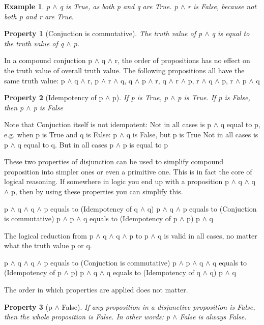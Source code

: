 \documentclass[10pt,a4paper,draft,titlepage,onecolumn]{book}
\newtheorem{example}{Example}[section]
\newtheorem{property}{Property}[section]
\begin{document}
\begin{example}
p $\wedge$ q is True, as both p and q are True.
p $\wedge$ r is False, because not both p and r are True.
\end{example}

\begin{property}[Conjuction is commutative] The truth value of p $\wedge$  q is equal to the truth value of q $\wedge$ p.
\end{property}
In a compound conjuction p $\wedge$ q $\wedge$ r, the order of propositions has no effect on the truth value of overall truth value. The following propositions all have the same truth value:
p $\wedge$ q $\wedge$ r,
p $\wedge$ r $\wedge$ q,
q $\wedge$ p $\wedge$ r,
q $\wedge$ r $\wedge$ p,
r $\wedge$ q $\wedge$ p,
r $\wedge$ p $\wedge$ q
\begin{property}[Idempotency of p $\wedge$  p] If p is True, p $\wedge$ p is True. If p is False, then p $\wedge$ p is False
\end{property}
Note that Conjuction itself is not idempotent: 
Not in all cases is  p $\wedge$ q equal to p, e.g. when p is True and q is False: p $\wedge$ q is False, but p is True
Not in all cases is  p $\wedge$ q equal to q. 
But in all cases   p $\wedge$ p is equal to p 

These two properties of disjunction can be used to simplify compound proposition into simpler ones or even a primitive one. This is in fact the core of logical reasoning. 
If somewhere in logic you end up with a proposition p $\wedge$ q $\wedge$ q $\wedge$ p, then by using these properties you can simplify this.

p $\wedge$ q $\wedge$ q $\wedge$ p
equals to (Idempotency of q $\wedge$ q) 
p $\wedge$ q $\wedge$ p
equals to  (Conjuction is commutative)
p $\wedge$ p $\wedge$ q
equals to (Idempotency of p $\wedge$ p)
p $\wedge$ q

The logical reduction from  p $\wedge$ q $\wedge$ q $\wedge$ p to p $\wedge$ q is valid in all cases, no matter what the truth value p or q.				

p $\wedge$ q $\wedge$ q $\wedge$ p
equals to (Conjuction is commutative)
p $\wedge$ p $\wedge$ q $\wedge$ q
equals to  (Idempotency of p $\wedge$ p)
p $\wedge$ q $\wedge$ q
equals to (Idempotency of q $\wedge$ q)
p $\wedge$ q

The order in which properties are applied does not matter. 

\begin{property}[p $\wedge$  False]  If any proposition in a disjunctive proposition is False, then the whole proposition is False. In other words: p $\wedge$  False is always False.
\end{property}
\end{document}
